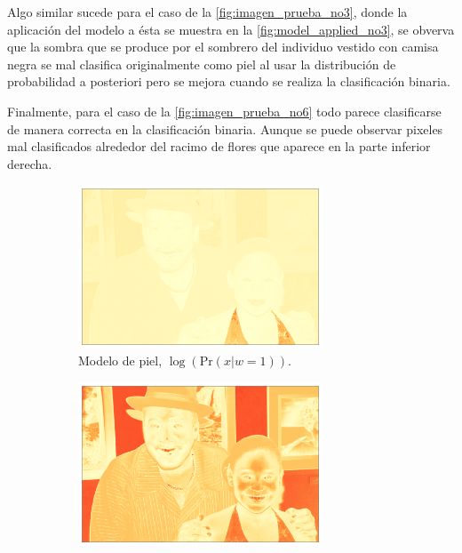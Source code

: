 Algo similar sucede para el caso de la \cref{fig:imagen_prueba_no3}, donde la aplicación del modelo a ésta se muestra en la \cref{fig:model_applied_no3}, se obverva que la sombra que se produce por el sombrero del individuo vestido con camisa negra se mal clasifica originalmente como piel al usar la distribución de probabilidad a posteriori pero se mejora cuando se realiza la clasificación binaria.

Finalmente, para el caso de la \cref{fig:imagen_prueba_no6} todo parece clasificarse de manera correcta en la clasificación binaria. Aunque se puede observar pixeles mal clasificados alrededor del racimo de flores que aparece en la parte inferior derecha.

\newpage
\begin{figure}[ht!]
    \centering
    \begin{subfigure}{0.4\textwidth}
        \centering
        \includegraphics[width=0.8\textwidth]{../figures/image3/image_03_distskin.png}
        \caption{Modelo de piel, $\log(\text{Pr}(x | w=1))$.}
    \end{subfigure}
    \hspace{1cm}
    \begin{subfigure}{0.4\textwidth}
        \centering
        \includegraphics[width=0.8\textwidth]{../figures/image3/image_03_distbg.png}

\end{subfigure}
\end{figure}

